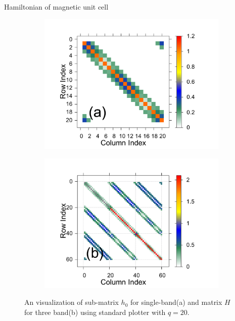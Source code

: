 \documentclass[aspectratio=169,compress,x11names]{beamer}
\begin{document}
	\begin{frame}{Hamiltonian of magnetic unit cell}
		\begin{figure}
			\centering
			\begin{subfigure}[b]{0.495\textwidth}
				\centering
				\includegraphics[width=0.8\linewidth]{../pic/matrix_1band_h0_q_20.pdf}
				\label{fig:3 band matrix}
			\end{subfigure}
			\begin{subfigure}[b]{0.495\textwidth}
				\centering
				\includegraphics[width=0.8\linewidth]{../pic/matrix_3band_h0_q_20.pdf}
				\label{fig:1 band matrix}
			\end{subfigure}
			\caption[A visualization of super matrix.]{
				An visualization of sub-matrix $h_{0}$ for single-band(a) and matrix $H$ for three band(b) using standard plotter with $q = 20$.
			}
		\end{figure}
	\end{frame}
\end{document}
